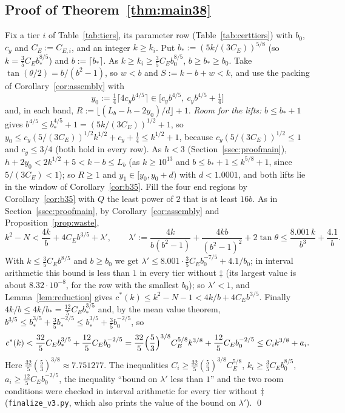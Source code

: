 \documentclass[11pt]{amsart}
\newcommand{\cs}{c^{*}}
\theoremstyle{definition}
\theoremstyle{remark}
\numberwithin{equation}{section}
\begin{document}
\subsection{Proof of Theorem~\ref{thm:main38}}\label{ssec:proofthm38}
Fix a tier $i$ of Table~\ref{tab:tiers}, its parameter row (Table~\ref{tab:certtiers}) with $b_0$, $c_y$ and
$C_E:=C_{E,i}$, and an integer $k\ge k_i$. Put $b_*:=(5k/(3C_E))^{5/8}$ (so $k=\frac35C_Eb_*^{8/5}$) and
$b:=\lceil b_*\rceil$. As $k\ge k_i\ge\frac35C_Eb_0^{8/5}$, $b\ge b_*\ge b_0$. Take $\tan(\theta/2)=b/(b^2-1)$, so $w<b$
and $S:=k-b+w<k$, and use the packing of Corollary~\ref{cor:assembly} with
\[
y_0:=\tfrac14\bigl\lceil4c_yb^{4/5}\bigr\rceil\in\bigl[c_yb^{4/5},\ c_yb^{4/5}+\tfrac14\bigr]
\]
and, in each band, $R:=\lfloor(L_b-h-2y_0)/d\rfloor+1$. \emph{Room for the lifts:} $b\le b_*+1$ gives
$b^{4/5}\le b_*^{4/5}+1=(5k/(3C_E))^{1/2}+1$, so $y_0\le c_y(5/(3C_E))^{1/2}k^{1/2}+c_y+\frac14\le k^{1/2}+1$, because
$c_y(5/(3C_E))^{1/2}\le1$ and $c_y\le3/4$ (both hold in every row). As $h<3$ (Section~\ref{ssec:proofmain}),
$h+2y_0<2k^{1/2}+5<k-b\le L_b$ (as $k\ge10^{13}$ and $b\le b_*+1\le k^{5/8}+1$, since $5/(3C_E)<1$); so $R\ge1$ and
$y_1\in[y_0,y_0+d)$ with $d<1.0001$, and both lifts lie in the window of Corollary~\ref{cor:b35}. Fill the four end
regions by Corollary~\ref{cor:b35} with $Q$ the least power of $2$ that is at least $16b$. As in
Section~\ref{ssec:proofmain}, by Corollary~\ref{cor:assembly} and Proposition~\ref{prop:waste},
\[
k^2-N<\frac{4k}b+4C_Eb^{3/5}+\lambda',\qquad \lambda':=\frac{4k}{b(b^2-1)}+\frac{4kb}{(b^2-1)^2}+2\tan\theta\le
\frac{8.001\,k}{b^3}+\frac{4.1}b .
\]
With $k\le\frac35C_Eb^{8/5}$ and $b\ge b_0$ we get $\lambda'\le8.001\cdot\frac35C_Eb_0^{-7/5}+4.1/b_0$; in interval
arithmetic this bound is less than $1$ in every tier without $\ddagger$ (its largest value is about $8.32\cdot10^{-8}$, for the row with the
smallest $b_0$); so $\lambda'<1$, and Lemma~\ref{lem:reduction} gives $\cs(k)\le k^2-N-1<4k/b+4C_Eb^{3/5}$. Finally
$4k/b\le4k/b_*=\frac{12}5C_Eb_*^{3/5}$ and, by the mean value theorem, $b^{3/5}\le b_*^{3/5}+\frac35b_*^{-2/5}\le
b_*^{3/5}+\frac35b_0^{-2/5}$, so
\[
\cs(k)<\frac{32}5C_Eb_*^{3/5}+\frac{12}5C_Eb_0^{-2/5}
=\frac{32}5\Bigl(\frac53\Bigr)^{3/8}C_E^{5/8}k^{3/8}+\frac{12}5C_Eb_0^{-2/5}\le C_ik^{3/8}+a_i .
\]
Here $\frac{32}5(\frac53)^{3/8}\approx7.751277$. The inequalities $C_i\ge\frac{32}5(\frac53)^{3/8}C_E^{5/8}$,
$k_i\ge\frac35C_Eb_0^{8/5}$, $a_i\ge\frac{12}5C_Eb_0^{-2/5}$, the inequality ``bound on $\lambda'$ less than $1$'' and
the two room conditions were checked in interval arithmetic for every tier without $\ddagger$ (\texttt{finalize\_v3.py}, which also prints
the value of the bound on $\lambda'$). \qed
\end{document}
